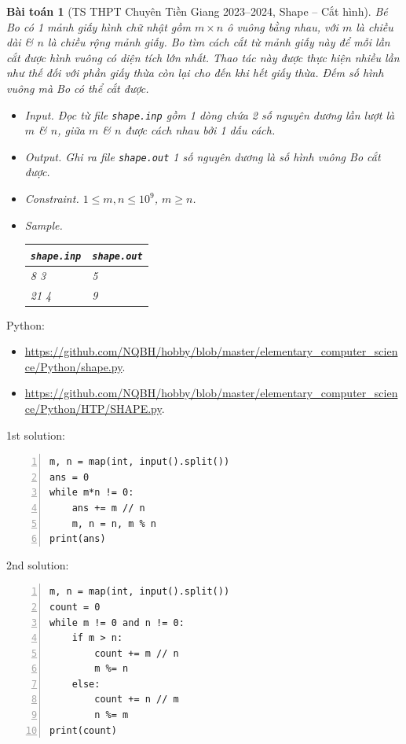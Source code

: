 \documentclass{article}
\newtheorem{baitoan}{Bài toán}
\begin{document}
\begin{baitoan}[TS THPT Chuyên Tiền Giang 2023--2024, Shape -- Cắt hình]
	Bé Bo có 1 mảnh giấy hình chữ nhật gồm $m\times n$ ô vuông bằng nhau, với $m$ là chiều dài \& $n$ là chiều rộng mảnh giấy. Bo tìm cách cắt từ mảnh giấy này để mỗi lần cắt được hình vuông có diện tích lớn nhất. Thao tác này được thực hiện nhiều lần như thế đối với phần giấy thừa còn lại cho đến khi hết giấy thừa. Đếm số hình vuông mà Bo có thể cắt được.
	\begin{itemize}
		\item {\sf Input.} Đọc từ file {\tt shape.inp} gồm 1 dòng chứa 2 số nguyên dương lần lượt là $m$ \& $n$, giữa $m$ \& $n$ được cách nhau bởi 1 dấu cách.
		\item {\sf Output.} Ghi ra file {\tt shape.out} 1 số nguyên dương là số hình vuông Bo cắt được.
		\item {\sf Constraint.} $1\le m,n\le10^9$, $m\ge n$.
		\item {\sf Sample.}
		\begin{table}[H]
			\centering
			\begin{tabular}{|l|l|}
				\hline
				{\tt shape.inp} & {\tt shape.out} \\
				\hline
				8 3 & 5 \\
				\hline
				21 4 & 9 \\
				\hline
			\end{tabular}
		\end{table}
	\end{itemize}
\end{baitoan}
Python:
\begin{itemize}
	\item \url{https://github.com/NQBH/hobby/blob/master/elementary_computer_science/Python/shape.py}.
	\item \url{https://github.com/NQBH/hobby/blob/master/elementary_computer_science/Python/HTP/SHAPE.py}.
\end{itemize}

\begin{multicols}{2}
	1st solution:
\begin{Verbatim}[numbers=left,xleftmargin=5mm]
m, n = map(int, input().split())
ans = 0
while m*n != 0:
    ans += m // n
    m, n = n, m % n
print(ans)
\end{Verbatim}
\vfill
\columnbreak
2nd solution:
\begin{Verbatim}[numbers=left,xleftmargin=5mm]
m, n = map(int, input().split())
count = 0
while m != 0 and n != 0:
    if m > n:
        count += m // n
        m %= n
    else:
        count += n // m
        n %= m
print(count)
\end{Verbatim}
\end{multicols}
\end{document}
